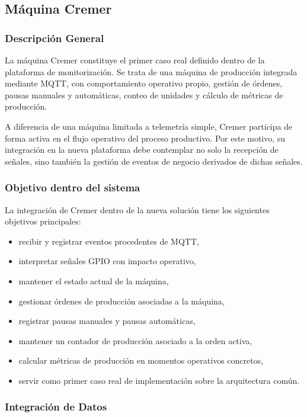 \subsection{Máquina Cremer}

\subsubsection{Descripción General}

La máquina Cremer constituye el primer caso real definido dentro de la plataforma de monitorización. Se trata de una máquina de producción integrada mediante MQTT, con comportamiento operativo propio, gestión de órdenes, pausas manuales y automáticas, conteo de unidades y cálculo de métricas de producción.

A diferencia de una máquina limitada a telemetría simple, Cremer participa de forma activa en el flujo operativo del proceso productivo. Por este motivo, su integración en la nueva plataforma debe contemplar no solo la recepción de señales, sino también la gestión de eventos de negocio derivados de dichas señales.

\subsubsection{Objetivo dentro del sistema}

La integración de Cremer dentro de la nueva solución tiene los siguientes objetivos principales:

\begin{itemize}
    \item recibir y registrar eventos procedentes de MQTT,
    \item interpretar señales GPIO con impacto operativo,
    \item mantener el estado actual de la máquina,
    \item gestionar órdenes de producción asociadas a la máquina,
    \item registrar pausas manuales y pausas automáticas,
    \item mantener un contador de producción asociado a la orden activa,
    \item calcular métricas de producción en momentos operativos concretos,
    \item servir como primer caso real de implementación sobre la arquitectura común.
\end{itemize}

\subsubsection{Integración de Datos}

